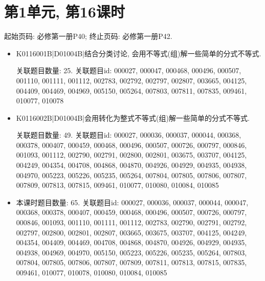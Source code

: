 \section*{第1单元, 第16课时}
起始页码: 必修第一册P40; 终止页码: 必修第一册P42.
\begin{itemize}
\item K0116001B|D01004B|结合分类讨论, 会用不等式(组)解一些简单的分式不等式.

关联题目数量: 25. 关联题目id: 000027, 000047, 000468, 000496, 000507, 001110, 001111, 001112, 002783, 002792, 002797, 002807, 003665, 004125, 004409, 004469, 004969, 005150, 005264, 007803, 007811, 007835, 009461, 010077, 010078

\item K0116002B|D01004B|会用转化为整式不等式(组)解一些简单的分式不等式.

关联题目数量: 49. 关联题目id: 000027, 000036, 000037, 000044, 000368, 000378, 000407, 000459, 000468, 000496, 000507, 000726, 000797, 000846, 001093, 001112, 002790, 002791, 002800, 002801, 003675, 003707, 004125, 004249, 004354, 004708, 004868, 004870, 004926, 004929, 004935, 004938, 004970, 005223, 005226, 005235, 005264, 007804, 007805, 007806, 007807, 007809, 007813, 007815, 009461, 010077, 010080, 010084, 010085

\item 本课时题目数量: 65. 关联题目id: 000027, 000036, 000037, 000044, 000047, 000368, 000378, 000407, 000459, 000468, 000496, 000507, 000726, 000797, 000846, 001093, 001110, 001111, 001112, 002783, 002790, 002791, 002792, 002797, 002800, 002801, 002807, 003665, 003675, 003707, 004125, 004249, 004354, 004409, 004469, 004708, 004868, 004870, 004926, 004929, 004935, 004938, 004969, 004970, 005150, 005223, 005226, 005235, 005264, 007803, 007804, 007805, 007806, 007807, 007809, 007811, 007813, 007815, 007835, 009461, 010077, 010078, 010080, 010084, 010085

\end{itemize}

